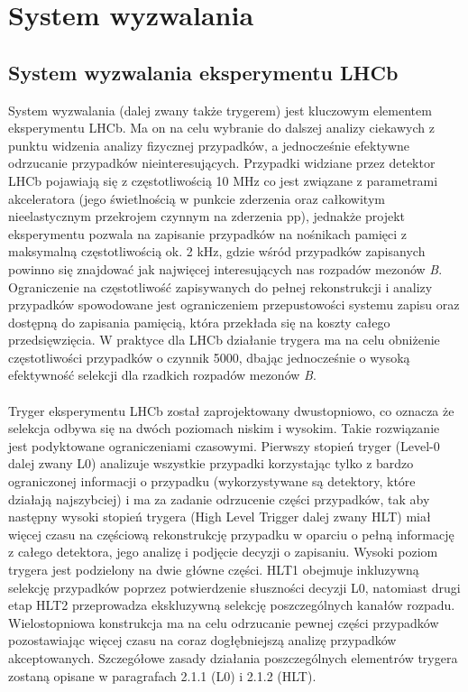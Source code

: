 \documentclass{pracamgr}
\begin{document}
\chapter{System wyzwalania}

\section{System wyzwalania eksperymentu LHCb}
System wyzwalania (dalej zwany także trygerem) jest kluczowym elementem eksperymentu LHCb. Ma on na celu wybranie do dalszej analizy ciekawych z punktu widzenia analizy fizycznej przypadków, a jednocześnie efektywne odrzucanie przypadków nieinteresujących. Przypadki widziane przez detektor LHCb pojawiają się z częstotliwością 10 MHz co jest związane z parametrami akceleratora (jego świetlnością w punkcie zderzenia oraz całkowitym nieelastycznym przekrojem czynnym na zderzenia pp), jednakże projekt eksperymentu pozwala na zapisanie przypadków na nośnikach pamięci z maksymalną częstotliwością ok. 2 kHz, gdzie wśród przypadków zapisanych powinno się znajdować jak najwięcej interesujących nas rozpadów mezonów \textit{B}. Ograniczenie na częstotliwość zapisywanych do pełnej rekonstrukcji i analizy przypadków spowodowane jest ograniczeniem przepustowości systemu zapisu oraz dostępną do zapisania pamięcią, która przekłada się na koszty całego przedsięwzięcia. W praktyce dla LHCb działanie trygera ma na celu obniżenie częstotliwości przypadków o czynnik 5000, dbając jednocześnie o wysoką efektywność selekcji dla rzadkich rozpadów mezonów \textit{B}.
\\\\
\noindent
Tryger eksperymentu LHCb został zaprojektowany dwustopniowo, co oznacza że selekcja odbywa się na dwóch poziomach niskim i wysokim. Takie rozwiązanie jest podyktowane ograniczeniami czasowymi. Pierwszy stopień tryger (Level-0 dalej zwany L0) analizuje wszystkie przypadki korzystając tylko z bardzo ograniczonej informacji o przypadku (wykorzystywane są detektory, które działają najszybciej) i ma za zadanie odrzucenie części przypadków, tak aby następny wysoki stopień trygera (High Level Trigger dalej zwany HLT) miał więcej czasu na częściową rekonstrukcję przypadku w oparciu o pełną informację z całego detektora, jego analizę i podjęcie decyzji o zapisaniu. Wysoki poziom trygera jest podzielony na dwie główne części. HLT1 obejmuje inkluzywną selekcję przypadków poprzez potwierdzenie słuszności decyzji L0, natomiast drugi etap HLT2 przeprowadza ekskluzywną selekcję poszczególnych kanałów rozpadu. Wielostopniowa konstrukcja ma na celu odrzucanie pewnej części przypadków pozostawiając więcej czasu na coraz dogłębniejszą analizę przypadków akceptowanych. Szczegółowe zasady działania poszczególnych elementrów trygera zostaną opisane w paragrafach 2.1.1 (L0) i 2.1.2 (HLT).
\end{document}
